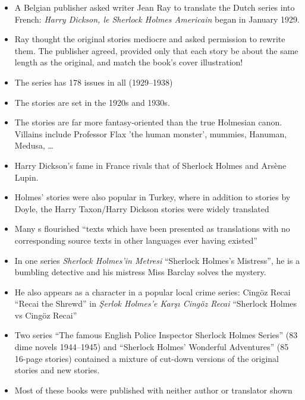 \documentclass[a4paper,landscape,headrule,footrule,xetex]{foils}
\begin{document}

\begin{itemize}
\item A Belgian publisher asked writer Jean Ray to translate the Dutch
  series into French: \textit{Harry Dickson, le Sherlock
  Holmes Americain} began in January 1929.
\item Ray thought the original stories mediocre and asked permission
  to rewrite them.  The publisher agreed, provided only that each
  story be about the same length as the original, and match the book's
  cover illustration!
\item The series has 178 issues in all (1929--1938)
\item The stories are set in the 1920s and 1930s.
\item The stories are far more fantasy-oriented than the true
  Holmesian canon.  Villains include Professor Flax 'the human
  monster', mummies, Hanuman, Medusa, \ldots
\item Harry Dickson's fame in France rivals that of Sherlock Holmes and Arsène Lupin.
\end{itemize}



\begin{itemize}
\item Holmes' stories were also popular in Turkey, where in addition
  to stories by Doyle, the Harry Taxon/Harry Dickson stories were
  widely translated
\item Many s flourished ``texts which have
  been presented as translations with no corresponding source texts in
  other languages ever having existed''
\item In one series \textit{Sherlock Holmes'in Metresi} ``Sherlock
  Holmes's Mistress'', he is a bumbling detective and his mistress Miss
  Barclay solves the mystery.
\item He also appears as a character in a popular local crime series: Cingöz Recai ``Recai the Shrewd'' in \textit{Şerlok Holmes'e Karşı Cingöz Recai} ``Sherlock Holmes vs Cingöz Recai''
\item Two series ``The famous English Police Inspector Sherlock Holmes
  Series'' (83 dime novels 1944--1945) and ``Sherlock Holmes'
  Wonderful Adventures'' (85 16-page stories) contained a mixture of
  cut-down versions of the original stories and new stories.
\item Most of these books were published with neither author or
  translator shown
\end{itemize}
\end{document}
